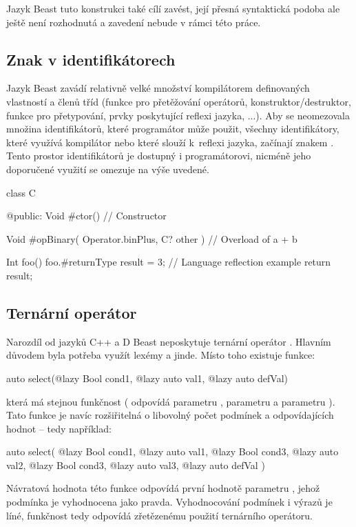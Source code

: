 Jazyk Beast tuto konstrukci také cílí zavést, její přesná syntaktická podoba ale ještě není rozhodnutá a zavedení nebude v rámci této práce.

\subsection{Znak \inlineCode{\#} v identifikátorech}
Jazyk Beast zavádí relativně velké množství kompilátorem definovaných vlastností a členů tříd (funkce pro přetěžování operátorů, konstruktor/destruktor, funkce pro přetypování, prvky poskytující reflexi jazyka, ...). Aby se neomezovala množina identifikátorů, které programátor může použit, všechny identifikátory, které využívá kompilátor nebo které slouží k~reflexi jazyka, začínají znakem \inlineCode{\#}. Tento prostor identifikátorů je dostupný i programátorovi, nicméně jeho doporučené využití se omezuje na výše uvedené.

\begin{code}
class C {

@public:
	Void #ctor() {
		// Constructor	
	}

	Void #opBinary( Operator.binPlus, C? other ) {
		// Overload of a + b
	}

	Int foo() {
		foo.#returnType	result = 3; // Language reflection example
		return result;
	}
	
}
\end{code}

\subsection{Ternární operátor} \label{ternary}
Narozdíl od jazyků C++ a D Beast neposkytuje ternární operátor . Hlavním důvodem byla potřeba využít lexémy  a \inlineDCode{:} jinde. Místo toho existuje funkce:

\begin{code}
auto select(@lazy Bool cond1, @lazy auto val1, @lazy auto defVal)
\end{code}
která má stejnou funkčnost ( odpovídá parametru ,  parametru  a  parametru ). Tato funkce je navíc rozšiřitelná o libovolný počet podmínek a odpovídajících hodnot -- tedy například:

\begin{code}
auto select(
	@lazy Bool cond1, @lazy auto val1,
	@lazy Bool cond3, @lazy auto val2,
	@lazy Bool cond3, @lazy auto val3,
	@lazy auto defVal
	)
\end{code}
Návratová hodnota této funkce odpovídá první hodnotě parametru , jehož podmínka  je vyhodnocena jako pravda. Vyhodnocování podmínek i výrazů je líné, funkčnost tedy odpovídá zřetězenému použití ternárního operátoru.

